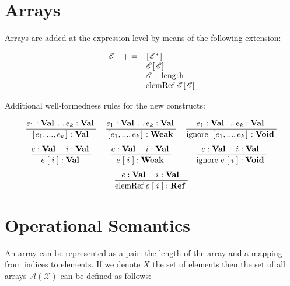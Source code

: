 \documentclass{article}
\author{Dmitry Boulytchev}
\newcommand{\trule}[2]{\dfrac{#1}{#2}}
\newcommand{\withenv}[2]{{#1}\vdash{#2}}
\newcommand{\llang}[1]{\mbox{\lstinline[mathescape]|#1|}}
\newcommand{\primi}[2]{\mathbf{#1}\;{#2}}
\theoremstyle{definition}
\begin{document}
\section{Arrays}

Arrays are added at the expression level by means of the following extension:

\[
\begin{array}{rcl}
  \mathscr E & += & \llang{[}\mathscr E^*\llang{]} \\
             &    & \mathscr E \llang{[$\mathscr E$]} \\
             &    & \mathscr E \;\llang{. length} \\
             &    & \llang{elemRef}\; \mathscr E\llang{[$\mathscr E$]}
\end{array}
\]

Additional well-formedness rules for the new constructs:

\ifdefined\Ref
  \renewcommand{\Ref}{\primi{Ref}{}}
\else 
  \newcommand{\Ref}{\primi{Ref}{}}
\fi
\newcommand{\Val}{\primi{Val}{}}
\newcommand{\Void}{\primi{Void}{}}
\newcommand{\Weak}{\primi{Weak}{}}


\renewcommand{\withenv}[2]{{#2}:{#1}}
\[
\begin{array}{ccc}
  \trule{\withenv{\Val}{e_1}\,...\,\withenv{\Val}{e_k}}{\withenv{\Val}{\llang{[}e_1,...,e_k\llang{]}}} &
  \trule{\withenv{\Val}{e_1}\,...\,\withenv{\Val}{e_k}}{\withenv{\Weak}{\llang{[}e_1,...,e_k\llang{]}}} &
  \trule{\withenv{\Val}{e_1}\,...\,\withenv{\Val}{e_k}}{\withenv{\Void}{\llang{ignore [}e_1,...,e_k\llang{]}}} \\[5mm]
  \trule{\withenv{\Val}{e}\quad\withenv{\Val}{i}}{\withenv{\Val}{\llang{$e\;$[$\;i\;$]}}} &
  \trule{\withenv{\Val}{e}\quad\withenv{\Val}{i}}{\withenv{\Weak}{\llang{$e\;$[$\;i\;$]}}} &
  \trule{\withenv{\Val}{e}\quad\withenv{\Val}{i}}{\withenv{\Void}{\llang{ignore $\;e\;$[$\;i\;$]}}}\\[5mm]
  \multicolumn{3}{c}{\trule{\withenv{\Val}{e}\quad\withenv{\Val}{i}}{\withenv{\Ref}{\llang{elemRef $\;e\;$[$\;i\;$]}}}}
\end{array}
\]

\section{Operational Semantics}

An array can be represented as a pair: the length of the array and a mapping from indices to elements. If we denote
$X$ the set of elements then the set of all arrays $\mathscr A (\mathscr X)$ can be defined as follows:
\end{document}
